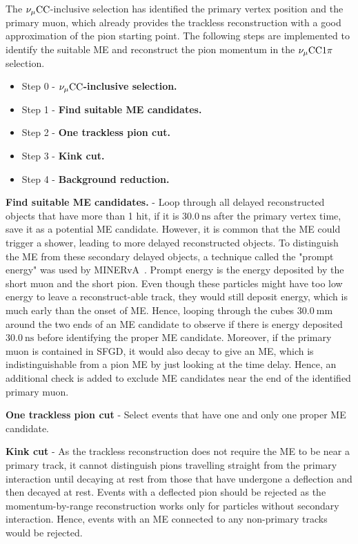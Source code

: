             The $\nu_{\mu}\textrm{CC}$-inclusive selection has identified the primary vertex position and the primary muon, which already provides the trackless reconstruction with a good approximation of the pion starting point. The following steps are implemented to identify the suitable ME and reconstruct the pion momentum in the $\nu_{\mu}\textrm{CC}1\pi$ selection. 

            \begin{itemize}
                \item Step 0 - \textbf{$\nu_{\mu}\textrm{CC}$-inclusive selection.}
                \item Step 1 - \textbf{Find suitable ME candidates.} 
                \item Step 2 - \textbf{One trackless pion cut.}
                \item Step 3 - \textbf{Kink cut.}
                \item Step 4 - \textbf{Background reduction.}
            \end{itemize}
        
            \textbf{Find suitable ME candidates.} - Loop through all delayed reconstructed objects that have more than 1 hit, if it is $30.0~\textrm{ns}$ after the primary vertex time, save it as a potential ME candidate. 
            However, it is common that the ME could trigger a shower, leading to more delayed reconstructed objects. 
            To distinguish the ME from these secondary delayed objects, a technique called the "prompt energy" was used by MINERvA~\cite{Zhang2016}. 
            Prompt energy is the energy deposited by the short muon and the short pion. 
            Even though these particles might have too low energy to leave a reconstruct-able track, they would still deposit energy, which is much early than the onset of ME. 
            Hence, looping through the cubes $30.0~\textrm{mm}$ around the two ends of an ME candidate to observe if there is energy deposited $30.0~\textrm{ns}$ before identifying the proper ME candidate. 
            Moreover, if the primary muon is contained in SFGD, it would also decay to give an ME, which is indistinguishable from a pion ME by just looking at the time delay. 
            Hence, an additional check is added to exclude ME candidates near the end of the identified primary muon. 
        
            \textbf{One trackless pion cut} - Select events that have one and only one proper ME candidate.
        
            \textbf{Kink cut} - As the trackless reconstruction does not require the ME to be near a primary track, it cannot distinguish pions travelling straight from the primary interaction until decaying at rest from those that have undergone a deflection and then decayed at rest. 
            Events with a deflected pion should be rejected as the momentum-by-range reconstruction works only for particles without secondary interaction. 
            Hence, events with an ME connected to any non-primary tracks would be rejected.
        
